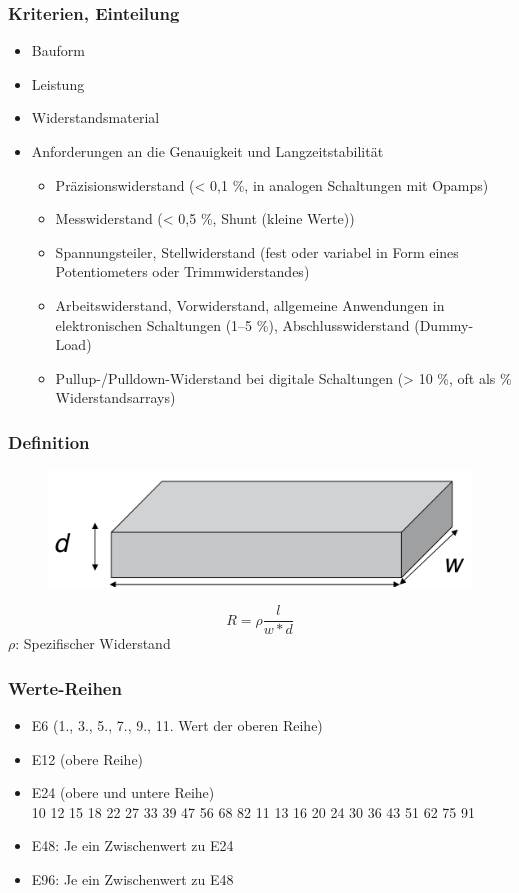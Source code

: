 \subsubsection{Kriterien, Einteilung}
\begin{itemize}
  \item Bauform
  \item Leistung
  \item Widerstandsmaterial
  \item Anforderungen an die Genauigkeit und Langzeitstabilität
  \begin{itemize}
    \item Präzisionswiderstand (< 0,1 \%, in analogen Schaltungen mit Opamps)
    \item Messwiderstand (< 0,5 \%, Shunt (kleine Werte))
    \item Spannungsteiler, Stellwiderstand (fest oder variabel in Form eines
    Potentiometers oder Trimmwiderstandes)
    \item Arbeitswiderstand, Vorwiderstand, allgemeine Anwendungen in
    elektronischen Schaltungen (1–5 \%), Abschlusswiderstand (Dummy- Load)
    \item Pullup-/Pulldown-Widerstand bei digitale Schaltungen (> 10 \%, oft als
    \% Widerstandsarrays)
    \end{itemize}
\end{itemize}
\newpage
\subsubsection{Definition}
\begin{figure}[htbs]
\includegraphics[scale=0.5]{pictures/widerstand}
\end{figure}
\begin{equation}
R=\rho\frac{l}{w*d}
\end{equation}
$\rho$: Spezifischer Widerstand

\subsubsection{Werte-Reihen}
\begin{itemize}
  \item E6 (1., 3., 5., 7., 9., 11. Wert der oberen Reihe)
  \item E12 (obere Reihe)
  \item E24 (obere und untere Reihe)\\
  10 12 15 18 22 27 33 39 47 56 68 82 11  13 16 20 24 30 36 43 51 62 75 91
  \item E48: Je ein Zwischenwert zu E24
  \item E96: Je ein Zwischenwert zu E48
\end{itemize}

